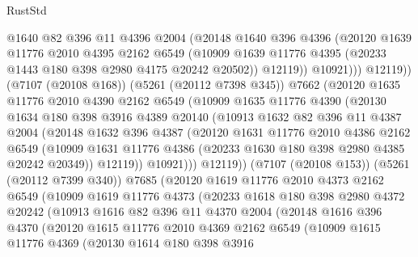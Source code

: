 \begin{lexlean}{RustStd}
\begin{coremodule}
                  @1640
                  @82
                  @396
                  @11
                  @4396
                  @2004
                  (@20148
                    @1640
                    @396
                    @4396
                    (@20120
                      @1639
                      @11776
                      @2010
                      @4395
                      @2162
                      @6549
                      (@10909 @1639 @11776 @4395 (@20233 @1443 @180 @398 @2980 @4175 @20242 @20502))
                      @12119))
                  @10921)))
            @12119))
        (@7107 (@20108 @168))
        (@5261 (@20112 @7398 @345))
        @7662
        (@20120
          @1635
          @11776
          @2010
          @4390
          @2162
          @6549
          (@10909
            @1635
            @11776
            @4390
            (@20130
              @1634
              @180
              @398
              @3916
              @4389
              @20140
              (@10913
                @1632
                @82
                @396
                @11
                @4387
                @2004
                (@20148
                  @1632
                  @396
                  @4387
                  (@20120
                    @1631
                    @11776
                    @2010
                    @4386
                    @2162
                    @6549
                    (@10909 @1631 @11776 @4386 (@20233 @1630 @180 @398 @2980 @4385 @20242 @20349))
                    @12119))
                @10921)))
          @12119))
      (@7107 (@20108 @153))
      (@5261 (@20112 @7399 @340))
      @7685
      (@20120
        @1619
        @11776
        @2010
        @4373
        @2162
        @6549
        (@10909
          @1619
          @11776
          @4373
          (@20233
            @1618
            @180
            @398
            @2980
            @4372
            @20242
            (@10913
              @1616
              @82
              @396
              @11
              @4370
              @2004
              (@20148
                @1616
                @396
                @4370
                (@20120
                  @1615
                  @11776
                  @2010
                  @4369
                  @2162
                  @6549
                  (@10909
                    @1615
                    @11776
                    @4369
                    (@20130
                      @1614
                      @180
                      @398
                      @3916

\end{coremodule}
\end{lexlean}
